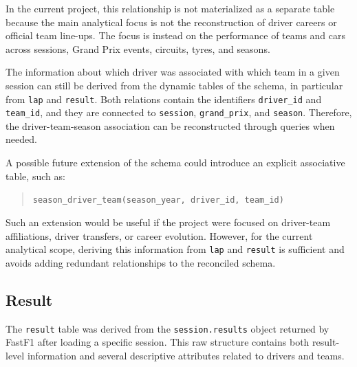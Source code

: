 \documentclass[12pt,a4paper]{article}
\begin{document}
	In the current project, this relationship is not materialized as a separate table because
	the main analytical focus is not the reconstruction of driver careers or official team
	line-ups. The focus is instead on the performance of teams and cars across sessions,
	Grand Prix events, circuits, tyres, and seasons.
	
	The information about which driver was associated with which team in a given session
	can still be derived from the dynamic tables of the schema, in particular from
	\texttt{lap} and \texttt{result}. Both relations contain the identifiers \texttt{driver\_id}
	and \texttt{team\_id}, and they are connected to \texttt{session}, \texttt{grand\_prix},
	and \texttt{season}. Therefore, the driver-team-season association can be reconstructed
	through queries when needed.
	
	A possible future extension of the schema could introduce an explicit associative table,
	such as:
	
	\begin{quote}
		\texttt{season\_driver\_team(season\_year, driver\_id, team\_id)}
	\end{quote}
	

	Such an extension would be useful if the project were focused on driver-team
	affiliations, driver transfers, or career evolution. However, for the current analytical
	scope, deriving this information from \texttt{lap} and \texttt{result} is sufficient and
	avoids adding redundant relationships to the reconciled schema.
	
	\subsection{Result}
	
	The \texttt{result} table was derived from the \texttt{session.results} object returned by FastF1 after loading a specific session.
	This raw structure contains both result-level information and several descriptive attributes related to drivers and teams.
\end{document}
